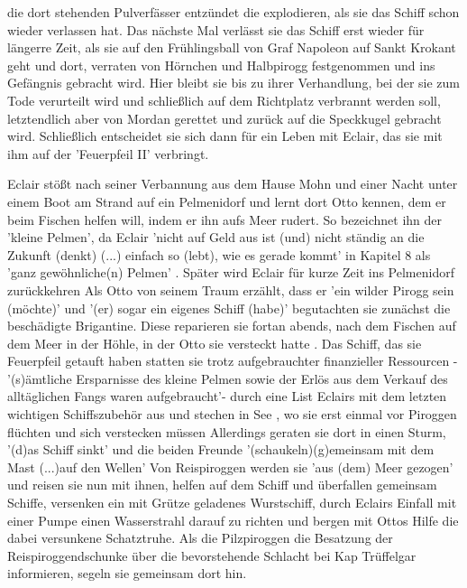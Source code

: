 die dort stehenden Pulverfässer entzündet die explodieren, als sie das Schiff schon wieder verlassen hat. \cite[S.257ff]{pir} Das nächste Mal verlässt sie das Schiff erst wieder für längerre Zeit, als sie auf den Frühlingsball von Graf Napoleon auf Sankt Krokant geht\cite[S.542]{pir} und dort, verraten von Hörnchen und Halbpirogg festgenommen\cite[S.549ff]{pir}  und ins Gefängnis gebracht wird.\cite[S.549]{pir} Hier bleibt sie bis zu ihrer Verhandlung, bei der sie zum Tode verurteilt wird\cite[S.569]{pir} und schließlich auf dem Richtplatz verbrannt werden soll, letztendlich aber von Mordan gerettet und zurück auf die Speckkugel gebracht wird.\cite[S.607]{pir} Schließlich entscheidet sie sich dann für ein Leben mit Eclair\cite[S.635]{pir}, das sie mit ihm auf der 'Feuerpfeil II' verbringt.\cite[S.639ff]{pir}

Eclair stößt nach seiner Verbannung aus dem Hause Mohn \cite[S.41]{pir} und einer Nacht unter einem Boot am Strand \cite[S.43]{pir} auf ein Pelmenidorf \cite[S.43]{pir} und lernt dort Otto kennen, dem er beim Fischen helfen will, indem er ihn aufs Meer rudert.\cite[S.45]{pir} So bezeichnet ihn der 'kleine Pelmen'\cite[S.45]{pir}, da Eclair 'nicht auf Geld aus ist (und) nicht ständig an die Zukunft (denkt) (...) einfach so (lebt), wie es gerade kommt' in Kapitel 8 als 'ganz gewöhnliche(n) Pelmen' \cite[S.68]{pir}. Später wird Eclair für kurze Zeit ins Pelmenidorf zurückkehren \cite[S.515ff]{pir}Als Otto von seinem Traum erzählt, dass er 'ein wilder Pirogg sein (möchte)'\cite[S.69f]{pir} und '(er) sogar ein eigenes Schiff (habe)' \cite[S.70]{pir} begutachten sie zunächst die beschädigte Brigantine\cite[S.75f]{pir}. Diese reparieren sie fortan abends, nach dem Fischen auf dem Meer\cite[S.90]{pir} in der Höhle, in der Otto sie versteckt hatte \cite[S.74f]{pir}. Das Schiff, das sie Feuerpfeil getauft haben\cite[S.92f]{pir} statten sie trotz aufgebrauchter finanzieller Ressourcen - '(s)ämtliche Ersparnisse des kleine Pelmen sowie der Erlös aus dem Verkauf des alltäglichen Fangs waren aufgebraucht'\cite[S.105]{pir}- durch eine List Eclairs mit dem letzten wichtigen Schiffszubehör aus\cite[S.106ff]{pir} und stechen in See \cite[S.136]{pir}, wo sie erst einmal vor Piroggen flüchten und sich verstecken müssen \cite[S.153ff]{pir} Allerdings geraten sie dort in einen Sturm, '(d)as Schiff sinkt' \cite[S.204]{pir} und die beiden Freunde '(schaukeln)(g)emeinsam mit dem Mast (...)auf den Wellen'\cite[S.205]{pir} Von Reispiroggen werden sie 'aus (dem) Meer gezogen'\cite[S.213]{pir} und reisen sie nun mit ihnen, helfen auf dem Schiff\cite[S.217]{pir} und überfallen gemeinsam Schiffe\cite[S.279ff]{pir}, versenken ein mit Grütze geladenes Wurstschiff,\cite[S.315]{pir} durch Eclairs Einfall mit einer Pumpe einen Wasserstrahl darauf zu richten \cite[S.310ff]{pir} und bergen mit Ottos Hilfe die dabei versunkene Schatztruhe.\cite[S.315f]{pir} Als die Pilzpiroggen die Besatzung der Reispiroggendschunke über die bevorstehende Schlacht bei Kap Trüffelgar informieren, segeln sie gemeinsam dort hin.\cite[S.318ff]{pir}
